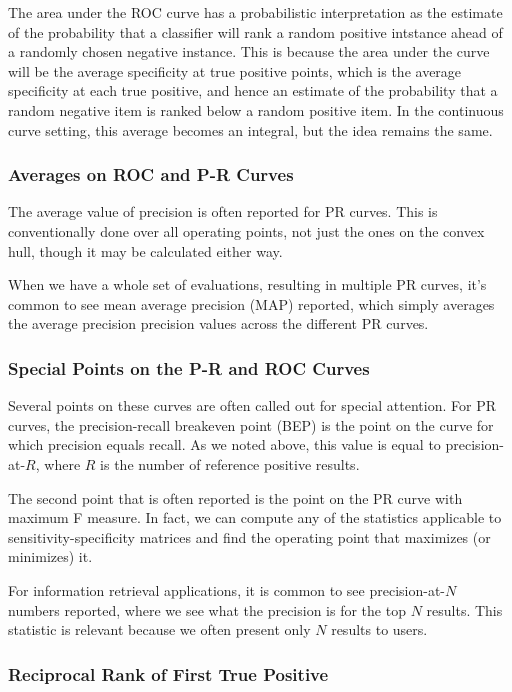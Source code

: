 The area under the ROC curve has a probabilistic interpretation as the
estimate of the probability that a classifier will rank a random
positive intstance ahead of a randomly chosen negative instance.  This
is because the area under the curve will be the average specificity
at true positive points, which is the average specificity at each
true positive, and hence an estimate of the probability that a random
negative item is ranked below a random positive item.  In the continuous
curve setting, this average becomes an integral, but the idea remains
the same.


\subsubsection{Averages on ROC and P-R Curves}

The average value of precision is often reported for PR curves.  This
is conventionally done over all operating points, not just the ones on
the convex hull, though it may be calculated either way.  

When we have a whole set of evaluations, resulting in multiple PR
curves, it's common to see mean average precision (MAP) reported,
which simply averages the average precision precision values across
the different PR curves.


\subsubsection{Special Points on the P-R and ROC Curves}

Several points on these curves are often called out for special
attention.  For PR curves, the precision-recall breakeven point (BEP)
is the point on the curve for which precision equals recall.  As
we noted above, this value is equal to precision-at-$R$, where
$R$ is the number of reference positive results.

The second point that is often reported is the point on the PR curve
with maximum F measure.  In fact, we can compute any of the statistics
applicable to sensitivity-specificity matrices and find the operating
point that maximizes (or minimizes) it.

For information retrieval applications, it is common to see
precision-at-$N$ numbers reported, where we see what the precision is
for the top $N$ results.  This statistic is relevant because we often
present only $N$ results to users.


\subsubsection{Reciprocal Rank of First True Positive}

